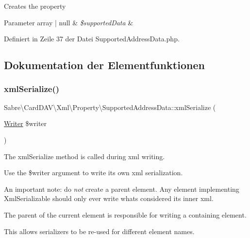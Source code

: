 Creates the property


\begin{DoxyParams}[1]{Parameter}
array | null & {\em \$supported\+Data} & \\
\hline
\end{DoxyParams}


Definiert in Zeile 37 der Datei Supported\+Address\+Data.\+php.



\subsection{Dokumentation der Elementfunktionen}
\mbox{\label{class_sabre_1_1_card_d_a_v_1_1_xml_1_1_property_1_1_supported_address_data_aa256af8c77abf22674375c882a89fb77}} 
\subsubsection{\texorpdfstring{xml\+Serialize()}{xmlSerialize()}}
{\footnotesize\ttfamily Sabre\textbackslash{}\+Card\+D\+A\+V\textbackslash{}\+Xml\textbackslash{}\+Property\textbackslash{}\+Supported\+Address\+Data\+::xml\+Serialize (\begin{DoxyParamCaption}\item[{\mbox{\hyperlink{class_sabre_1_1_v_object_1_1_writer}{Writer}}}]{\$writer }\end{DoxyParamCaption})}

The xml\+Serialize method is called during xml writing.

Use the \$writer argument to write its own xml serialization.

An important note\+: do {\itshape not} create a parent element. Any element implementing Xml\+Serializable should only ever write what\textquotesingle{}s considered its \textquotesingle{}inner xml\textquotesingle{}.

The parent of the current element is responsible for writing a containing element.

This allows serializers to be re-\/used for different element names.


